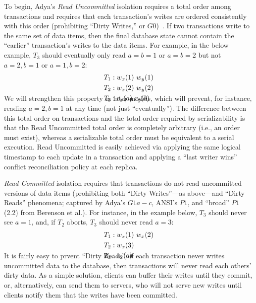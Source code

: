 To begin, Adya's \textit{Read Uncommitted} isolation requires a total
order among transactions and requires that each transaction's writes
are ordered consistently with this order (prohibiting ``Dirty
Writes,'' or $G0$)~\cite{adya}. If two transactions write to the same
set of data items, then the final database state cannot contain the
``earlier'' transaction's writes to the data items. For example, in
the below example, $T_3$ should eventually only read $a=b=1$ or
$a=b=2$ but not $a=2, b=1$ or $a=1, b=2$:
\begin{align*}
\small
T_1 &: w_x(1)~w_y(1)
\\T_2 &: w_x(2)~w_y(2)
\\T_3 &: r_x(a)~r_y(b)\\[-2em]
\end{align*}
We will strengthen this property in later models, which will prevent,
for instance, reading $a=2, b=1$ at any time (not just
``eventually''). The difference between this total order on
transactions and the total order required by serializability is that
the Read Uncommitted total order is completely arbitrary (i.e., an
order must exist), whereas a serializable total order must be
equivalent to a serial execution. Read Uncommitted is easily achieved
via applying the same logical timestamp to each update in a
transaction and applying a ``last writer wins'' conflict
reconciliation policy at each replica.

\textit{Read Committed} isolation requires that transactions do not
read uncommitted versions of data items (prohibiting both ``Dirty
Writes''---as above---and ``Dirty Reads'' phenomena; captured by
Adya's $G1a-c$, ANSI's $P1$, and ``broad'' $P1$ (2.2) from Berenson et
al.). For instance, in the example below, $T_3$ should never see
$a=1$, and, if $T_2$ aborts, $T_3$ should never read $a=3$:
\vspace{-.5em}
\begin{align*}
\small
T_1 &: w_x(1)~w_x(2)
\\T_2 &: w_x(3)\\
T_3 &: r_x(a)\\[-2em]
\end{align*}
It is fairly easy to prvent ``Dirty Reads'': if each transaction never
writes uncommitted data to the database, then transactions will never
read each others' dirty data. As a simple solution, clients can buffer
their writes until they commit, or, alternatively, can send them to
servers, who will not serve new writes until clients notify them that
the writes have been committed.

